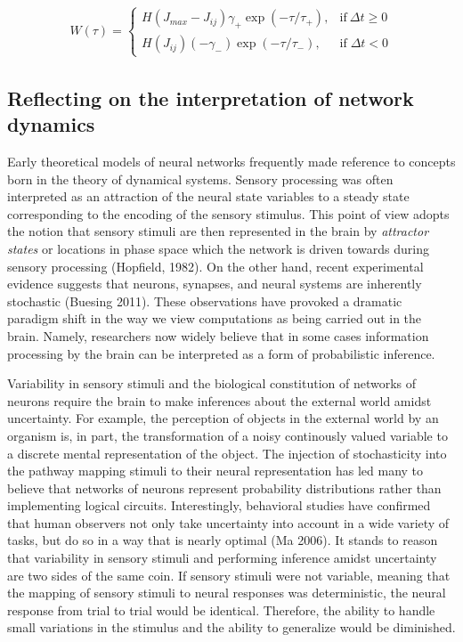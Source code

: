 \documentclass{ucetd}
\begin{document}
\begin{align*}
W(\tau) = \begin{cases}
      H(J_{max}-J_{ij})\gamma_{+}\exp(-\tau/\tau_{+}), & \text{if}\ \Delta t \geq 0 \\
       H(J_{ij})(-\gamma_{-})\exp(-\tau/\tau_{-}), & \text{if} \;\Delta t < 0
    \end{cases}
\end{align*}



\subsection{Reflecting on the interpretation of network dynamics}

Early theoretical models of neural networks frequently made reference to concepts born in the theory of dynamical systems. Sensory processing was often interpreted as an attraction of the neural state variables to a steady state corresponding to the encoding of the sensory stimulus. This point of view adopts the notion that sensory stimuli are then represented in the brain by \emph{attractor states} or locations in phase space which the network is driven towards during sensory processing (Hopfield, 1982). On the other hand, recent experimental evidence suggests that neurons, synapses, and neural systems are inherently stochastic (Buesing 2011). These observations have provoked a dramatic paradigm shift in the way we view computations as being carried out in the brain. Namely, researchers now widely believe that in some cases information processing by the brain  can be interpreted as a form of probabilistic inference.

Variability in sensory stimuli and the biological constitution of networks of neurons require the brain to make inferences about the external world amidst uncertainty. For example, the perception of objects in the external world by an organism is, in part, the transformation of a noisy continously valued variable to a discrete mental representation of the object. The injection of stochasticity into the pathway mapping stimuli to their neural representation has led many to believe that networks of neurons represent probability distributions rather than implementing logical circuits. Interestingly, behavioral studies have confirmed that human observers not only take uncertainty into account in a wide variety of tasks, but do so in a way that is nearly optimal (Ma 2006). It stands to reason that variability in sensory stimuli and performing inference amidst uncertainty are two sides of the same coin. If sensory stimuli were not variable, meaning that the mapping of sensory stimuli to neural responses was deterministic, the neural response from trial to trial would be identical. Therefore, the ability to handle small variations in the stimulus and the ability to generalize would be diminished.
\end{document}
